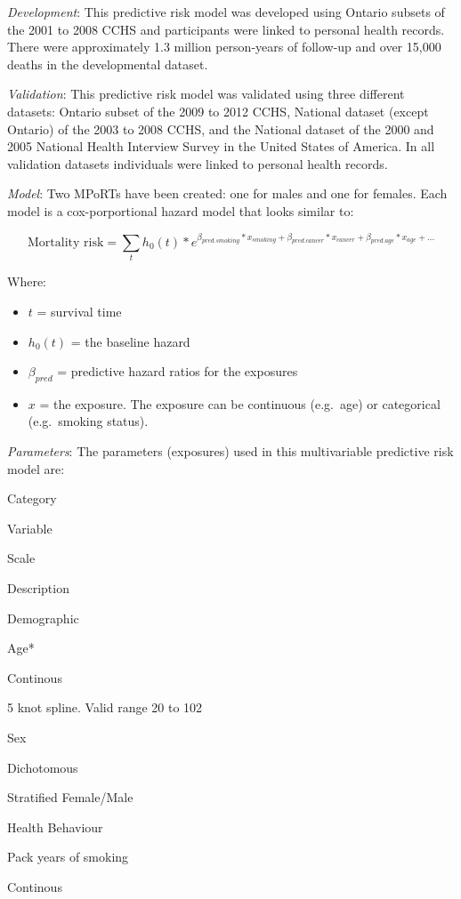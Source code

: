 \documentclass[]{book}
\providecommand{\tightlist}{%
  \setlength{\itemsep}{0pt}\setlength{\parskip}{0pt}}
\begin{document}
\emph{Development}: This predictive risk model was developed using
Ontario subsets of the 2001 to 2008 CCHS and participants were linked to
personal health records. There were approximately 1.3 million
person-years of follow-up and over 15,000 deaths in the developmental
dataset.

\emph{Validation}: This predictive risk model was validated using three
different datasets: Ontario subset of the 2009 to 2012 CCHS, National
dataset (except Ontario) of the 2003 to 2008 CCHS, and the National
dataset of the 2000 and 2005 National Health Interview Survey in the
United States of America. In all validation datasets individuals were
linked to personal health records.

\emph{Model}: Two MPoRTs have been created: one for males and one for
females. Each model is a cox-porportional hazard model that looks
similar to:

\[ \text{Mortality risk} = \sum_t h_0(t) * e^{\beta_{pred.smoking}*x_{smoking}+\beta_{pred.cancer}*x_{cancer} + \beta_{pred.age}*x_{age} +...}  \]

Where:

\begin{itemize}
\tightlist
\item
  \(t\) = survival time
\item
  \(h_0(t)\) = the baseline hazard
\item
  \(\beta_{pred}\) = predictive hazard ratios for the exposures
\item
  \(x\) = the exposure. The exposure can be continuous (e.g.~age) or
  categorical (e.g.~smoking status).
\end{itemize}

\emph{Parameters}: The parameters (exposures) used in this multivariable
predictive risk model are:

Category

Variable

Scale

Description

Demographic

Age*

Continous

5 knot spline. Valid range 20 to 102

Sex

Dichotomous

Stratified Female/Male

Health Behaviour

Pack years of smoking

Continous
\end{document}
